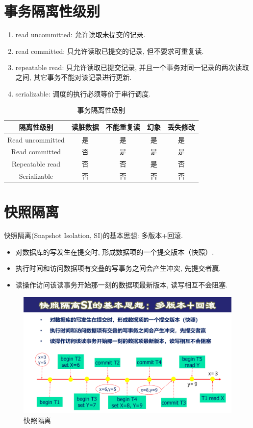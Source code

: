 \section{事务隔离性级别}

\begin{enumerate}
    \item read uncommitted: 允许读取未提交的记录.
    \item read committed: 只允许读取已提交的记录, 但不要求可重复读.
    \item repeatable read: 只允许读取已提交记录, 并且一个事务对同一记录的两次读取之间, 其它事务不能对该记录进行更新.
    \item serializable: 调度的执行必须等价于串行调度.
\end{enumerate}

\begin{table}[H]
  \centering
  \begin{tabular}{|c|c|c|c|c|}
    \hline
    \textbf{隔离性级别} & \textbf{读脏数据} & \textbf{不能重复读} & \textbf{幻象} & \textbf{丢失修改} \\ \hline
    Read uncommitted & 是 & 是 & 是 & 是 \\ \hline
    Read committed & 否 & 是 & 是 & 是 \\ \hline
    Repeatable read & 否 & 否 & 是 & 否 \\ \hline
    Serializable & 否 & 否 & 否 & 否 \\ \hline
  \end{tabular}
  \caption{事务隔离性级别}
\end{table}

\section{快照隔离}

快照隔离(Snapshot Isolation, SI)的基本思想: 多版本+回滚.
\begin{itemize}
  \item 对数据库的写发生在提交时, 形成数据项的一个提交版本（快照）.
  \item 执行时间和访问数据项有交叠的写事务之间会产生冲突, 先提交者赢.
  \item 读操作访问该读事务开始那一刻的数据项最新版本, 读写相互不会阻塞.
\end{itemize}

\begin{figure}[H]
    \centering
    \includegraphics[width=.6\textwidth]{./figure/快照隔离.pdf}
    \caption{快照隔离}
\end{figure}

